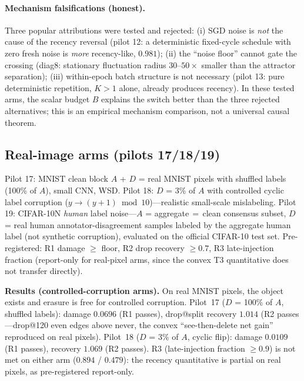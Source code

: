 \documentclass{article}
\newcommand{\B}{B}            %
\begin{document}
\paragraph{Mechanism falsifications (honest).} Three popular attributions were tested and
rejected: (i) SGD noise is \emph{not} the cause of the recency reversal (pilot 12: a
deterministic fixed-cycle schedule with zero fresh noise is \emph{more} recency-like, $0.981$);
(ii) the ``noise floor'' cannot gate the crossing (diag8: stationary fluctuation radius
$30$--$50\times$ smaller than the attractor separation); (iii) within-epoch batch structure is
not necessary (pilot 13: pure deterministic repetition, $K{>}1$ alone, already produces recency).
In these tested arms, the scalar budget $\B$ explains the switch better than the three rejected
alternatives; this is an empirical mechanism comparison, not a universal causal theorem.

\subsection{Real-image arms (pilots 17/18/19)}
\label{sec:real}
Pilot 17: MNIST clean block $A$ + $D$ = real MNIST pixels with shuffled labels (100\% of $A$),
small CNN, WSD. Pilot 18: $D$ = 3\% of $A$ with controlled cyclic label corruption
($y\!\to\!(y{+}1)\bmod 10$)---realistic small-scale mislabeling. Pilot 19: CIFAR-10N
\emph{human} label noise---$A$ = aggregate$\,=\,$clean consensus subset, $D$ = real human
annotator-disagreement samples labeled by the aggregate human label (not synthetic corruption),
evaluated on the official CIFAR-10 test set. Pre-registered: R1 damage $\ge$ floor, R2 drop
recovery $\ge0.7$, R3 late-injection fraction (report-only for real-pixel arms, since the convex
T3 quantitative does not transfer directly).

\textbf{Results (controlled-corruption arms).} On real MNIST pixels, the object exists and
erasure is free for controlled corruption. Pilot~17 ($D$ = 100\% of $A$, shuffled labels):
damage $0.0696$ (R1 passes), drop@split recovery $1.014$ (R2 passes---drop@120 even edges above
never, the convex ``see-then-delete net gain'' reproduced on real pixels). Pilot~18 ($D$ = 3\%
of $A$, cyclic flip): damage $0.0109$ (R1 passes), recovery $1.069$ (R2 passes). R3 (late-injection
fraction $\ge0.9$) is not met on either arm ($0.894$ / $0.479$): the recency quantitative is
partial on real pixels, as pre-registered report-only.
\end{document}
